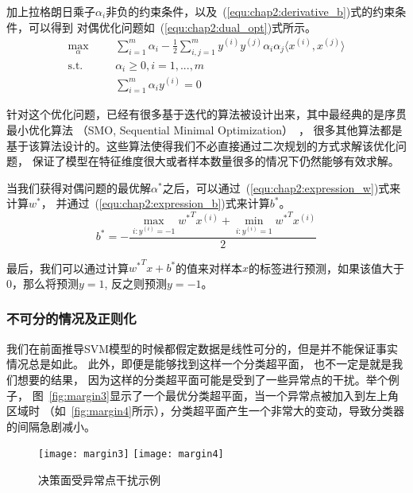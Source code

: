 加上拉格朗日乘子$\alpha_i$非负的约束条件，以及~(\ref{equ:chap2:derivative_b})式的约束条件，可以得到
对偶优化问题如~(\ref{equ:chap2:dual_opt})式所示。
\begin{equation}
  \label{equ:chap2:dual_opt}
  \begin{aligned}
    \max_{\alpha} &
    & & \sum_{i=1}^m\alpha_i-\frac{1}{2}\sum_{i,j=1}^m
    y^{(i)}y^{(j)}\alpha_i\alpha_j\langle x^{(i)},x^{(j)}\rangle\\
    \text{s.t.} &
    & & \alpha_i\geq 0, i=1,...,m \\
    \quad &
    & & \sum_{i=1}^m\alpha_iy^{(i)}=0
  \end{aligned}
\end{equation}

针对这个优化问题，已经有很多基于迭代的算法被设计出来，其中最经典的是序贯最小优化算法
（SMO, Sequential Minimal Optimization）~\cite{platt1998sequential}，
很多其他算法都是基于该算法设计的。这些算法使得我们不必直接通过二次规划的方式求解该优化问题，
保证了模型在特征维度很大或者样本数量很多的情况下仍然能够有效求解。

当我们获得对偶问题的最优解$\alpha^*$之后，可以通过~(\ref{equ:chap2:expression_w})式来计算$w^*$，
并通过~(\ref{equ:chap2:expression_b})式来计算$b^*$。
\begin{equation}
  \label{equ:chap2:expression_b}
  b^*=-\frac{\max_{i:y^{(i)}=-1}{w^*}^Tx^{(i)}+\min_{i:y^{(i)}=1}{w^*}^Tx^{(i)}}{2}
\end{equation}

最后，我们可以通过计算${w^*}^Tx+b^*$的值来对样本$x$的标签进行预测，如果该值大于0，那么将预测$y=1$,
反之则预测$y=-1$。

\subsubsection{不可分的情况及正则化}

我们在前面推导SVM模型的时候都假定数据是线性可分的，但是并不能保证事实情况总是如此。
此外，即便是能够找到这样一个分类超平面， 也不一定是就是我们想要的结果，
因为这样的分类超平面可能是受到了一些异常点的干扰。举个例子，
图~\ref{fig:margin3}显示了一个最优分类超平面，当一个异常点被加入到左上角区域时
（如~\ref{fig:margin4}所示），分类超平面产生一个非常大的变动，导致分类器的间隔急剧减小。
\begin{figure}[ht]
  \centering%
  {\texttt{[image: margin3]}}%
  \hspace{6em}%
  {\texttt{[image: margin4]}}
  \caption{决策面受异常点干扰示例}
  \label{fig:margin3+4}
\end{figure}

